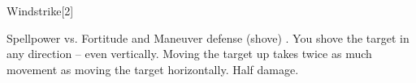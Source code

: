 \begin{spellsection}{Windstrike}[2]
    \begin{spellheader}
    \end{spellheader}
    \begin{spellcontent}
        \begin{spelltargetinginfo}
        \end{spelltargetinginfo}
        \begin{spelleffects}
            \begin{spellattack}{Spellpower vs. Fortitude and Maneuver defense (shove)}
                \spellsuccess[Fortitude] .
                \spellsuccess[Maneuver] You shove the target in any direction -- even vertically. Moving the target up takes twice as much movement as moving the target horizontally.
                \spellfailure[Fortitude] Half damage.
            \end{spellattack}
        \end{spelleffects}
    \end{spellcontent}
    \begin{spellfooter}
        \miscastrandom
    \end{spellfooter}
    \begin{spellaugments}
    \end{spellaugments}
\end{spellsection}

